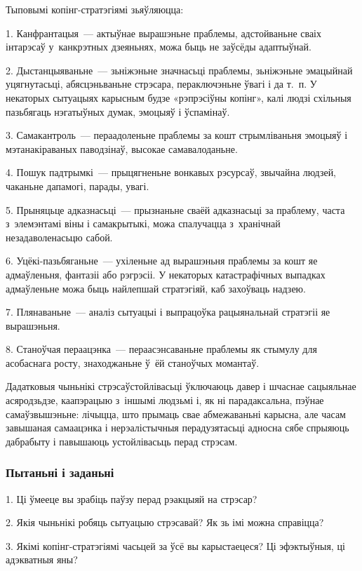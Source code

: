 Тыповымі копінг-стратэгіямі зьяўляюцца:

1. Канфрантацыя~--- актыўнае вырашэньне праблемы, адстойваньне сваіх інтарэсаў у~канкрэтных дзеяньнях, можа быць не заўсёды адаптыўнай.

2. Дыстанцыяваньне~--- зьніжэньне значнасьці праблемы, зьніжэньне эмацыйнай уцягнутасьці, абясцэньваньне стрэсара, пераключэньне ўвагі і да т.~п. У некаторых сытуацыях карысным будзе «рэпрэсіўны копінг», калі людзі схільныя пазьбягаць нэгатыўных думак, эмоцыяў і ўспамінаў.

3. Самакантроль~--- пераадоленьне праблемы за кошт стрымліваньня эмоцыяў і мэтанакіраваных паводзінаў, высокае самавалоданьне.

4. Пошук падтрымкі~--- прыцягненьне вонкавых рэсурсаў, звычайна людзей, чаканьне дапамогі, парады, увагі.

5. Прыняцьце адказнасьці~--- прызнаньне сваёй адказнасьці за праблему, часта з~элемэнтамі віны і самакрытыкі, можа спалучацца з~хранічнай незадаволенасьцю сабой.

6. Уцёкі-пазьбяганьне~--- ухіленьне ад вырашэньня праблемы за кошт яе адмаўленьня, фантазіі або рэгрэсіі. У некаторых катастрафічных выпадках адмаўленьне можа быць найлепшай стратэгіяй, каб захоўваць надзею.

7. Плянаваньне~--- аналіз сытуацыі і выпрацоўка рацыянальнай стратэгіі яе вырашэньня.

8. Станоўчая пераацэнка~--- пераасэнсаваньне праблемы як стымулу для асобаснага росту, знаходжаньне ў~ёй станоўчых момантаў.

Дадатковыя чыньнікі стрэсаўстойлівасьці ўключаюць давер і шчаснае сацыяльнае асяродзьдзе, каапэрацыю з~іншымі людзьмі і, як ні парадаксальна, пэўнае самаўзвышэньне: лічыцца, што прымаць свае абмежаваньні карысна, але часам завышаная самаацэнка і нерэалістычныя перадузятасьці адносна сябе спрыяюць дабрабыту і павышаюць устойлівасьць перад стрэсам.

\subsubsection{Пытаньні і заданьні}

1. Ці ўмееце вы зрабіць паўзу перад рэакцыяй на стрэсар?

2. Якія чыньнікі робяць сытуацыю стрэсавай? Як зь імі можна справіцца?

3. Якімі копінг-стратэгіямі часьцей за ўсё вы карыстаецеся? Ці эфэктыўныя, ці адэкватныя яны?


